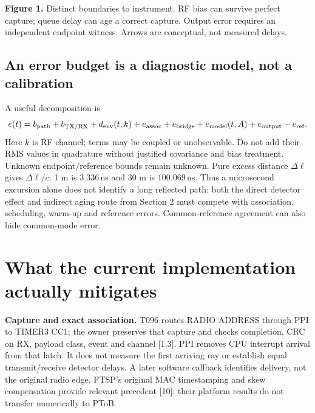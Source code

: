 \documentclass[11pt,letterpaper]{article}
\newcommand{\ns}{\,\mathrm{ns}}\newcommand{\us}{\,\mu\mathrm{s}}\newcommand{\ms}{\,\mathrm{ms}}
\begin{document}
\begin{center}
\end{center}\vspace{-6pt}
{\small\textbf{Figure 1.} Distinct boundaries to instrument. RF bias can survive perfect capture; queue delay can age a correct capture. Output error requires an independent endpoint witness. Arrows are conceptual, not measured delays.}

\subsection{An error budget is a diagnostic model, not a calibration}
A useful decomposition is
\[
 e(t)=b_{\rm path}+b_{\rm TX/RX}+d_{\rm env}(t,k)+e_{\rm assoc}
       +e_{\rm bridge}+e_{\rm model}(t,A)+e_{\rm output}-e_{\rm ref}.
\]
Here $k$ is RF channel; terms may be coupled or unobservable. Do not add their RMS values in quadrature without justified covariance and bias treatment. Unknown endpoint/reference bounds remain unknown. Pure excess distance $\Delta\ell$ gives $\Delta\ell/c$: 1 m is $3.336\ns$ and 30 m is $100.069\ns$. Thus a microsecond excursion alone does not identify a long reflected path: both the direct detector effect and indirect aging route from Section 2 must compete with association, scheduling, warm-up and reference errors. Common-reference agreement can also hide common-mode error.
\newpage
\section{What the current implementation actually mitigates}
\textbf{Capture and exact association.} T096 routes RADIO ADDRESS through PPI to TIMER3 CC1; the owner preserves that capture and checks completion, CRC on RX, payload class, event and channel [1,3]. PPI removes CPU interrupt arrival from that latch. It does not measure the first arriving ray or establish equal transmit/receive detector delays. A later software callback identifies delivery, not the original radio edge. FTSP's original MAC timestamping and skew compensation provide relevant precedent [10]; their platform results do not transfer numerically to PToB.
\end{document}
